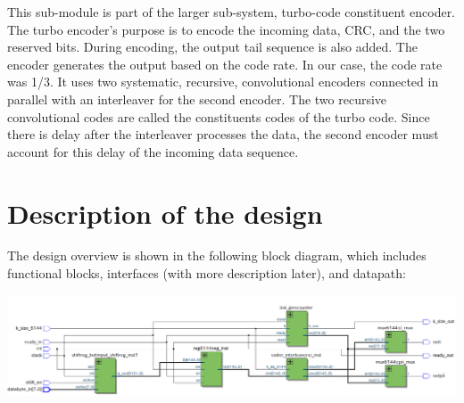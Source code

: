 \documentclass[letterpaper, 12pt]{article} %
\begin{document}
        This sub-module is part of the larger sub-system, turbo-code constituent encoder. The turbo encoder's purpose is to encode the incoming data, CRC, and the two reserved bits. During encoding, the output tail sequence is also added. The encoder generates the output based on the code rate. In our case, the code rate was 1/3. It uses two systematic, recursive, convolutional encoders connected in parallel with an interleaver for the second encoder. The two recursive convolutional codes are called the constituents codes of the turbo code. Since there is delay after the interleaver processes the data, the second encoder must account for this delay of the incoming data sequence.
\section{Description of the design}

The design overview is shown in the following block diagram, which includes functional blocks, interfaces (with more description later), and datapath:\\

\begin{minipage}{1.0\textwidth}
\includegraphics[width=15cm, angle=0]{files/rtl_all.png}
\centering
{}
\centering
\end{minipage}
\bigskip
\end{document}
